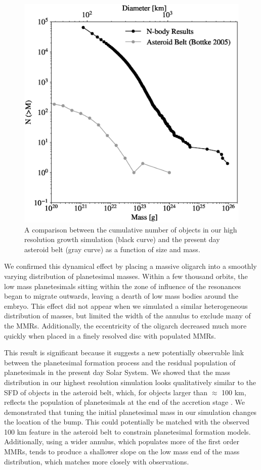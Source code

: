 \begin{figure}
    \begin{centering}
    \includegraphics[width=0.5\columnwidth]{figures/plSS/cum_asteroid_comparison.eps}
    \caption{A comparison between the cumulative number of objects in our high resolution growth simulation (black curve) and 
    the present day asteroid belt \cite{bottke05} (gray curve) as a function of size and mass.}
    \label{fig:mass_dist_ast_compare}
    \end{centering}
\end{figure}

We confirmed this dynamical effect by placing a massive oligarch into a smoothly varying distribution of planetesimal masses. 
Within a few thousand orbits, the low mass planetesimals sitting within the zone of influence of the resonances began to migrate 
outwards, leaving a dearth of low mass bodies around the embryo. This effect did not appear when we simulated a similar 
heterogeneous distribution of masses, but limited the width of the annulus to exclude many of the MMRs. Additionally, the 
eccentricity of the oligarch decreased much more quickly when placed in a finely resolved disc with populated MMRs.

This result is significant because it suggests a new potentially observable link between the planetesimal formation process and 
the residual population of planetesimals in the present day Solar System. We showed that the mass distribution in our highest 
resolution simulation looks qualitatively similar to the SFD of objects in the asteroid belt, which, for objects larger than $\approx$ 
100 km, reflects the population of planetesimals at the end of the accretion stage \cite{morbidelli09}. We demonstrated that 
tuning the initial planetesimal mass in our simulation changes the location of the bump. This could potentially be matched with 
the observed 100 km feature in the asteroid belt to constrain planetesimal formation models. Additionally, using a wider annulus, 
which populates more of the first order MMRs, tends to produce a shallower slope on the low mass end of the mass distribution, 
which matches more closely with observations.

